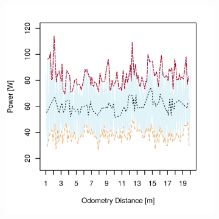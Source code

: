 \begin{figure}[h]
\captionsetup[subfigure]{justification=centering}
\vspace{-2ex}
	\centering
    \setlength{\subfigureWidth}{0.50\textwidth}
    \setlength{\graphicsHeight}{80mm}
    \hypersetup{hidelinks=true}%
    \begin{subfigure}[t]{\subfigureWidth}
        \centering
        \includegraphics[height=\graphicsHeight]{sections/power-system-design/power-budget/plots/locomotion-power-draw-on-flat-terrain-1.png}
        \label{fig:plot:sub:sherpatt-flat-terrain-power-draw-1}
    \end{subfigure}\hfill
    \begin{subfigure}[t]{\subfigureWidth}
        \centering

\end{subfigure}
\end{figure}
